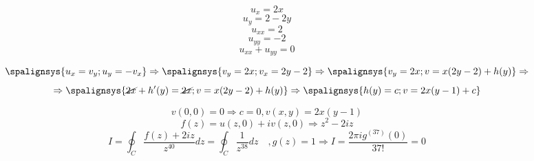 \documentclass[12pt]{article}
\begin{document}
$$u_x=2x
$$
$$u_y=2-2y
$$
$$u_{xx}=2
$$
$$u_{yy}=-2
$$
$$
u_{xx}+u_{yy}=0
$$

\[
\spalignsys {u_x=v_y;u_y=-v_x} \Rightarrow  
\spalignsys {v_y=2x;v_x=2y-2}
\Rightarrow 
\spalignsys
{v_y=2x;
v=x(2y-2)+h(y)} \Rightarrow
\]
\[
\Rightarrow
\spalignsys
{\cancel{2x}+h'(y)=\cancel{2x};
v=x(2y-2)+h(y)
} \Rightarrow
\spalignsys
{h(y)=c;
v=2x(y-1)+c} 
\]

$$
v(0,0)=0 \Rightarrow c=0 , v(x,y)=2x(y-1)
$$
$$
f(z)=u(z,0)+iv(z,0)\Rightarrow z^2-2iz
$$
$$
I=\oint_{C} \frac{f(z)+2iz}{z^{40}} dz=
\oint_{C}\frac{1}{z^{38}}dz \quad, g(z)=1
\Rightarrow 
I=\frac{2\pi i g^{(37)}(0)}{37!}=0
$$
\end{document}

